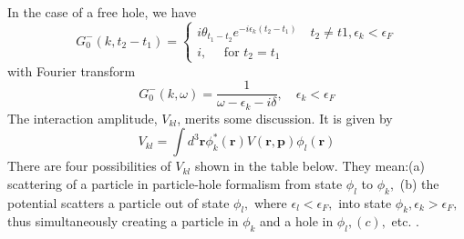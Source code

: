In the case of a free hole, we have
\begin{equation}G_{0}^{-}\left(k, t_{2}-t_{1}\right)=\left\{\begin{array}{l}
i \theta_{t_{1}-t_{2}} e^{-i \epsilon_{k}\left(t_{2}-t_{1}\right)}\quad t_2\neq t1,\epsilon_k<\epsilon_F \\
i, \quad \text { for } t_{2}=t_{1}
\end{array}\right.
\label{Gminus-t-space}
\end{equation}
with Fourier transform
\begin{equation}G_{0}^{-}(k, \omega)=\frac{1}{\omega-\epsilon_{k}-i \delta}, \quad \epsilon_{k}<\epsilon_{F}
\label{Gminus-k-space}
\end{equation}
The interaction amplitude, $V_{kl}$, merits some discussion. It is given by 
\begin{equation}V_{k l}=\int d^{3} \mathbf{r} \phi_{k}^{*}(\mathbf{r}) V(\mathbf{r}, \mathbf{p}) \phi_{l}(\mathbf{r})
\label{Vkl}
\end{equation}
There are four possibilities of $V_{kl}$ shown in the table below. They mean:(a) scattering of a particle in particle-hole formalism from state $\phi_{l}$ to $\phi_{k},$ (b) the potential scatters a particle out of state $\phi_{l},$ where $\epsilon_{l}<\epsilon_{F},$ into state $\phi_{k}, \epsilon_{k}>\epsilon_{F},$ thus simultaneously creating a particle in $\phi_{k}$ and a hole in $\phi_{l},(c),$ etc. .
